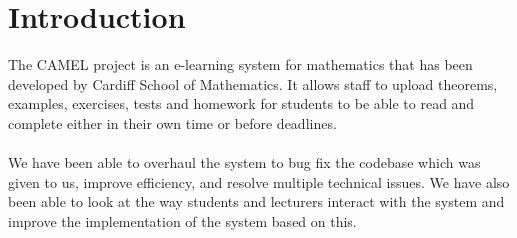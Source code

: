 \section{Introduction}

	The CAMEL project is an e-learning system for mathematics that has been developed by Cardiff School of Mathematics. It allows staff to upload theorems, examples, exercises, tests and homework for students to be able to read and complete either in their own time or before deadlines. \\\\
	We have been able to overhaul the system to bug fix the codebase which was given to us, improve efficiency, and resolve multiple technical issues. We have also been able to look at the way students and lecturers interact with the system and improve the implementation of the system based on this.
